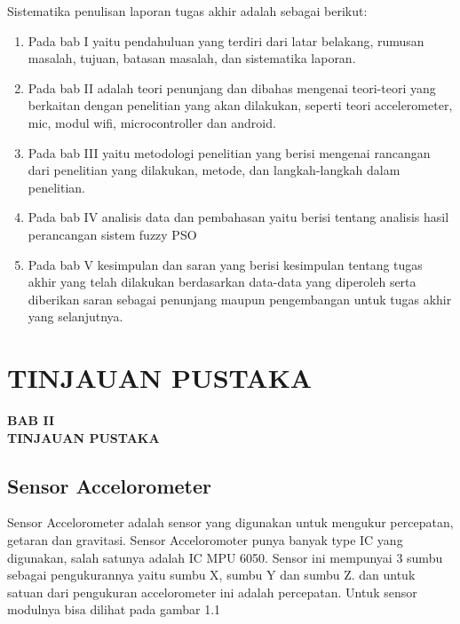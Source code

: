 \documentclass[11pt]{article}
\begin{document}
Sistematika penulisan laporan tugas akhir adalah sebagai berikut:

\begin{enumerate}[label=\alph*.]
	
		
	\item Pada bab I yaitu pendahuluan yang terdiri dari latar belakang, rumusan masalah, tujuan, batasan masalah, dan sistematika laporan. 
	\item Pada bab II adalah teori penunjang dan dibahas mengenai teori-teori yang berkaitan dengan penelitian yang akan dilakukan, seperti teori accelerometer, mic, modul wifi, microcontroller dan android.
	\item Pada bab III yaitu metodologi penelitian yang berisi mengenai rancangan dari penelitian yang dilakukan, metode, dan langkah-langkah dalam penelitian. 
	\item Pada bab IV analisis data dan pembahasan yaitu berisi tentang analisis hasil perancangan sistem fuzzy PSO
	\item Pada bab V kesimpulan dan saran yang berisi kesimpulan tentang tugas akhir yang telah dilakukan berdasarkan data-data yang diperoleh serta diberikan saran sebagai penunjang maupun pengembangan untuk tugas akhir yang selanjutnya. 
	
	
\end{enumerate}



\newpage

\setcounter{figure}{0}

\section{TINJAUAN PUSTAKA}

\begin{center}
	{\large \textbf{BAB II}} \\
	{\large \textbf{TINJAUAN PUSTAKA}}
\end{center}

\subsection{Sensor Accelorometer}

Sensor Accelorometer adalah sensor yang digunakan untuk mengukur percepatan, getaran dan gravitasi.
Sensor Acceloromoter punya banyak type IC yang digunakan, salah satunya adalah IC MPU 6050.
Sensor ini mempunyai 3 sumbu sebagai pengukurannya yaitu sumbu X, sumbu Y dan sumbu Z.
dan untuk satuan dari pengukuran accelorometer ini adalah percepatan.
Untuk sensor modulnya bisa dilihat pada gambar 1.1
\end{document}
